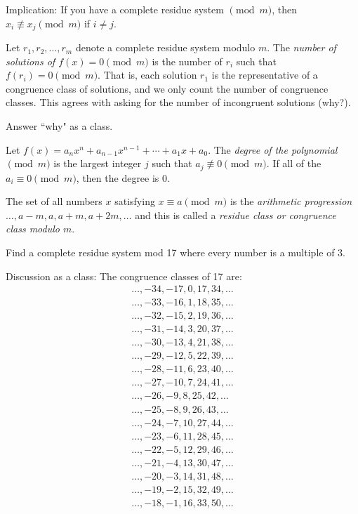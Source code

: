 \documentclass[letterpaper, 11 pt]{article}
\begin{document}
 Implication: If you have a complete residue system $\pmod m$, then $x_i\not\equiv x_j \pmod m$ if $i\neq j$.



\begin{defn}
 Let $r_1,r_2,\dots, r_m$ denote a complete residue system modulo $m$. The \emph{number of solutions of $f(x)=0 \pmod m$} is the number of $r_i$ such that $f(r_i)=0 \pmod m$. That is, each solution $r_1$ is the representative of a congruence class of solutions, and we only count the number of congruence classes. This agrees with asking for the number of incongruent solutions (why?).
\end{defn}

Answer ``why" as a class.

\begin{defn}
 Let $f(x)=a_nx^n+a_{n-1}x^{n-1}+\cdots+a_1x+a_0$. The \emph{degree of the polynomial $\!\pmod m$} is the largest integer $j$ such that $a_j\not\equiv 0 \pmod m$. If all of the $a_i\equiv 0 \pmod m$, then the degree is 0.
\end{defn}


\begin{defn}
 
 The set of all numbers $x$ satisfying $x\equiv a \pmod{m}$ is the \emph{arithmetic progression} $\dots, a-m , a, a+m, a+2m, \dots$ and this is called a \emph{residue class or congruence class modulo $m$}. 
\end{defn}

\begin{br}[2 minutes]
 Find a complete residue system mod 17 where every number is a multiple of 3.
\end{br}

Discussion as a class: The congruence classes of 17 are: 
\begin{align*}
 \dots, -34, -17, 0, 17, 34, \dots\\
 \dots, -33, -16, 1, 18, 35, \dots\\
 \dots, -32, -15, 2, 19, 36, \dots\\
 \dots, -31, -14, 3, 20, 37, \dots\\
 \dots, -30, -13, 4, 21, 38, \dots\\
 \dots, -29, -12, 5, 22, 39, \dots\\
 \dots, -28, -11, 6, 23, 40, \dots\\
 \dots, -27, -10, 7, 24, 41, \dots\\
 \dots, -26, -9, 8, 25, 42, \dots\\
 \dots, -25, -8, 9, 26, 43, \dots\\
 \dots, -24, -7, 10, 27, 44, \dots\\
 \dots, -23, -6, 11, 28, 45, \dots\\
 \dots, -22, -5, 12, 29, 46, \dots\\
 \dots, -21, -4, 13, 30, 47, \dots\\
 \dots, -20, -3, 14, 31, 48, \dots\\
 \dots, -19, -2, 15, 32, 49, \dots\\
 \dots, -18, -1, 16, 33, 50, \dots\\
\end{align*}
\end{document}
